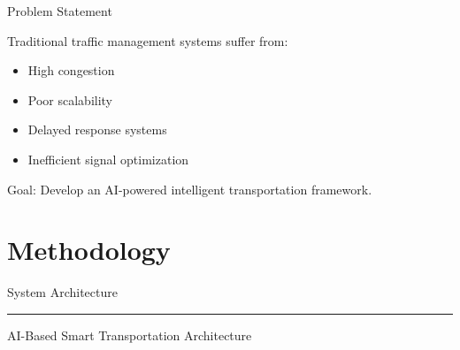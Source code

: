 \documentclass{beamer}
\begin{document}
	\begin{frame}{Problem Statement}
		
		Traditional traffic management systems suffer from:
		
		\begin{itemize}
			
			\item High congestion
			
			\item Poor scalability
			
			\item Delayed response systems
			
			\item Inefficient signal optimization
			
		\end{itemize}
		
		\vspace{0.5cm}
		
		Goal:
		Develop an AI-powered intelligent transportation framework.
		
	\end{frame}
	
	
	\section{Methodology}
	
	
	\begin{frame}{System Architecture}
		
		\begin{center}
			
			\rule{10cm}{5cm}
			
		\end{center}
		
		\vspace{0.5cm}
		
		\centering
		AI-Based Smart Transportation Architecture
		
	\end{frame}
	
	
\end{document}
